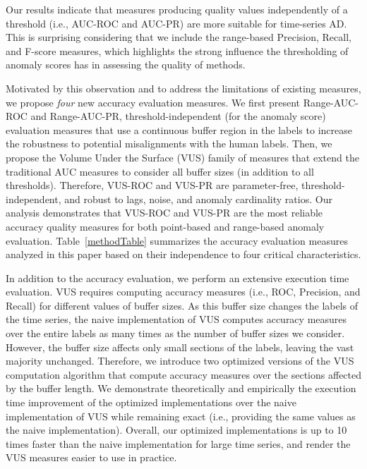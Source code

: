 Our results indicate that measures producing quality values independently of a threshold (i.e., AUC-ROC and AUC-PR) are more suitable for time-series AD. This is surprising considering that we include the range-based Precision, Recall, and F-score measures, which highlights the strong influence the thresholding of anomaly scores has in assessing the quality of methods. 

Motivated by this observation and to address the limitations of existing measures, we propose \textit{four} new accuracy evaluation measures. We first present Range-AUC-ROC and Range-AUC-PR, threshold-independent (for the anomaly score) evaluation measures that use a continuous buffer region in the labels to increase the robustness to potential misalignments with the human labels. Then, we propose the Volume Under the Surface (VUS) family of measures that extend the traditional AUC measures to consider all buffer sizes (in addition to all thresholds). Therefore, VUS-ROC and VUS-PR are parameter-free, threshold-independent, and robust to lags, noise, and anomaly cardinality ratios. 
Our analysis demonstrates that VUS-ROC and VUS-PR are the most reliable accuracy quality measures for both point-based and range-based anomaly evaluation. Table~\ref{methodTable} summarizes the accuracy evaluation measures analyzed in this paper based on their independence to four critical characteristics.

In addition to the accuracy evaluation, we perform an extensive execution time evaluation. 
VUS requires computing accuracy measures (i.e., ROC, Precision, and Recall) for different values of buffer sizes.
As this buffer size changes the labels of the time series, the naive implementation of VUS computes accuracy measures over the entire labels as many times as the number of buffer sizes we consider. However, the buffer size affects only small sections of the labels, leaving the vast majority unchanged. Therefore, we introduce two optimized versions of the VUS computation algorithm that compute accuracy measures over the sections affected by the buffer length. We demonstrate theoretically and empirically the execution time improvement of the optimized implementations over the naive implementation of VUS while remaining exact (i.e., providing the same values as the naive implementation). Overall, our optimized implementations is up to 10 times faster than the naive implementation for large time series, and render the VUS measures easier to use in practice.


